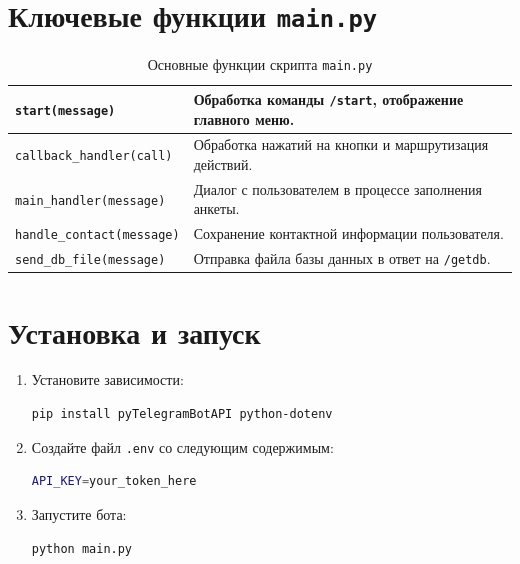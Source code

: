 \documentclass[a4paper,12pt]{article} %
\begin{document}
\section{Ключевые функции \texttt{main.py}} %
\begin{table}[h!]
\centering
\renewcommand{\arraystretch}{1.3}
\begin{tabular}{|p{}|p{10cm}|}
\hline
\texttt{start(message)} & Обработка команды \texttt{/start}, отображение главного меню. \\ \hline
\texttt{callback\_handler(call)} & Обработка нажатий на кнопки и маршрутизация действий. \\ \hline
\texttt{main\_handler(message)} & Диалог с пользователем в процессе заполнения анкеты. \\ \hline
\texttt{handle\_contact(message)} & Сохранение контактной информации пользователя. \\ \hline
\texttt{send\_db\_file(message)} & Отправка файла базы данных в ответ на \texttt{/getdb}. \\ \hline
\end{tabular}
\caption{Основные функции скрипта \texttt{main.py}}
\end{table}

\section{Установка и запуск} %
\begin{enumerate}
    \item Установите зависимости: %
    \begin{lstlisting}[language=bash]
pip install pyTelegramBotAPI python-dotenv
    \end{lstlisting}

    \item Создайте файл \texttt{.env} со следующим содержимым: %
    \begin{lstlisting}[language=bash]
API_KEY=your_token_here
    \end{lstlisting}

    \item Запустите бота: %
    \begin{lstlisting}[language=bash]
python main.py
    \end{lstlisting}
\end{enumerate}
\end{document}
